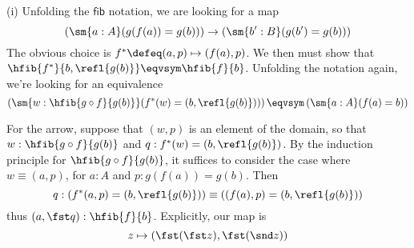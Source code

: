  \soln
(i) Unfolding the $\mathsf{fib}$ notation, we are looking for a map
\[
  \left(\sm{a:A} (g(f(a)) = g(b))\right) \to
  \left(\sm{b':B} (g(b') = g(b))\right)
\]
The obvious choice is $f^{*} \defeq (a, p) \mapsto (f(a), p)$.  We then must
show that $\hfib{f^{*}}{b, \refl{g(b)}} \eqvsym \hfib{f}{b}$.  Unfolding the
notation again, we're looking for an equivalence
\[
  \left(\sm{w:\hfib{g \circ f}{g(b)}} (f^{*}(w) = (b, \refl{g(b)}))\right)
  \eqvsym
  \left(\sm{a:A} (f(a) = b)\right)
\]


For the arrow, suppose that $(w, p)$ is an element of the domain, so that $w :
\hfib{g \circ f}{g(b)}$ and $q : f^{*}(w) = (b, \refl{g(b)})$.  By the
induction principle for $\hfib{g \circ f}{g(b)}$, it suffices to consider the
case where $w \equiv (a, p)$, for $a : A$ and $p : g(f(a)) = g(b)$.  Then
\[
  q : 
  (f^{*}(a, p) = (b, \refl{g(b)})) 
  \equiv
  ((f(a), p) = (b, \refl{g(b)})) 
\]
thus $(a, \fst q) : \hfib{f}{b}$.  Explicitly, our map is
\[
  z \mapsto (\fst(\fst z), \fst (\snd z))
\]


